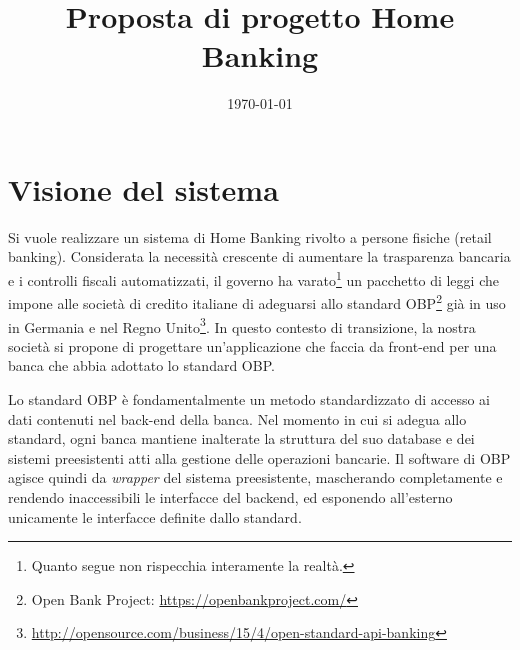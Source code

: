 \documentclass[]{softeng}
\title{Proposta di progetto Home Banking}
\date{\today}
\begin{document}
\maketitle

\section{Visione del sistema}

Si vuole realizzare un sistema di Home Banking rivolto a persone fisiche (retail banking).
Considerata la necessit\`a crescente di aumentare la trasparenza bancaria e i controlli fiscali automatizzati, il governo ha varato\footnote{Quanto segue non rispecchia interamente la realt\`a.} un pacchetto di leggi che impone alle societ\`a di credito italiane di adeguarsi allo standard OBP\footnote{Open Bank Project: \url{https://openbankproject.com/}} gi\`a in uso in Germania e nel Regno Unito\footnote{\url{http://opensource.com/business/15/4/open-standard-api-banking}}.
In questo contesto di transizione, la nostra societ\`a si propone di progettare un'applicazione che faccia da front-end per una banca che abbia adottato lo standard OBP.

Lo standard OBP \`e fondamentalmente un metodo standardizzato di accesso ai dati contenuti nel back-end della banca.
Nel momento in cui si adegua allo standard, ogni banca mantiene inalterate la struttura del suo database e dei sistemi preesistenti atti alla gestione delle operazioni bancarie.
Il software di OBP agisce quindi da \emph{wrapper} del sistema preesistente, mascherando completamente e rendendo inaccessibili le interfacce del backend, ed esponendo all'esterno unicamente le interfacce definite dallo standard.
\end{document}
